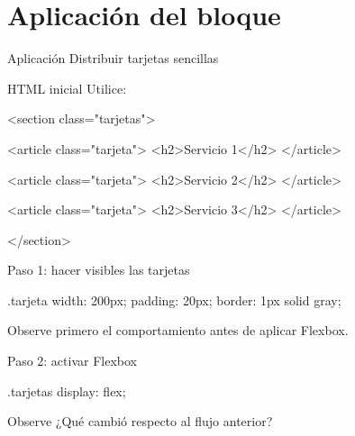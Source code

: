 \documentclass[aspectratio=169,11.5pt]{beamer}
\begin{document}

    \section{Aplicación del bloque}

    \SectionSlide
    {Aplicación}
    {Distribuir tarjetas sencillas}

    \begin{frame}[fragile]{HTML inicial}
        Utilice:

        \begin{htmlcodedark}
            <section class="tarjetas">

            <article class="tarjeta">
            <h2>Servicio 1</h2>
            </article>

            <article class="tarjeta">
            <h2>Servicio 2</h2>
            </article>

            <article class="tarjeta">
            <h2>Servicio 3</h2>
            </article>

            </section>
        \end{htmlcodedark}
    \end{frame}

    \begin{frame}[fragile]{Paso 1: hacer visibles las tarjetas}
        \begin{csscodedark}
            .tarjeta {
                width: 200px;
                padding: 20px;
                border: 1px solid gray;
            }
        \end{csscodedark}

        Observe primero el comportamiento
        antes de aplicar Flexbox.
    \end{frame}

    \begin{frame}[fragile]{Paso 2: activar Flexbox}
        \begin{csscodedark}
            .tarjetas {
                display: flex;
            }
        \end{csscodedark}

        \begin{block}{Observe}
            ¿Qué cambió respecto al flujo anterior?
        \end{block}
    \end{frame}
\end{document}
